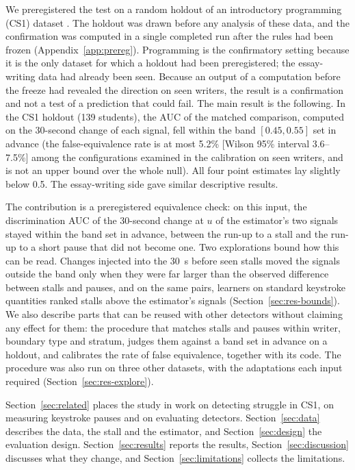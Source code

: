 We preregistered the test on a random holdout of an introductory programming (CS1) dataset \cite{edwards2023cs1}. The
holdout was drawn before any analysis of these data, and the confirmation was computed in a single completed run after
the rules had been frozen (Appendix~\ref{app:prereg}). Programming is the confirmatory setting because it is the only
dataset for which a holdout had been preregistered; the essay-writing data had already been seen. Because an output of a
computation before the freeze had revealed the direction on seen writers, the result is a confirmation and not a test of
a prediction that could fail. The main result is the following. In the CS1 holdout (139 students), the AUC of the matched comparison, computed on
the 30-second change of each signal, fell within the band $[0.45, 0.55]$ set in advance (the false-equivalence rate is at
most 5.2\% [Wilson 95\% interval 3.6--7.5\%] among the configurations examined in the calibration on seen writers, and
is not an upper bound over the whole null). All four point estimates lay slightly below 0.5. The essay-writing side
gave similar descriptive results.

The contribution is a preregistered equivalence check: on this input, the discrimination AUC of the 30-second change
at $u$ of the estimator's two signals stayed within the band set in advance, between the run-up to a stall and the
run-up to a short pause that did not become one. Two explorations bound how this can be read. Changes injected into the
30~s before seen stalls moved the signals outside the band only when they were far larger than the observed difference
between stalls and pauses, and on the same pairs, learners on standard keystroke quantities ranked stalls above the
estimator's signals (Section~\ref{sec:res-bounds}). We also describe parts that can be reused with other detectors
without claiming any effect for them: the procedure that matches stalls and pauses within writer, boundary type and
stratum, judges them against a band set in advance on a holdout, and calibrates the rate of false equivalence, together
with its code. The procedure was also run on three other datasets, with the adaptations each input required
(Section~\ref{sec:res-explore}).

Section~\ref{sec:related} places the study in work on detecting struggle in CS1, on measuring keystroke pauses and on
evaluating detectors. Section~\ref{sec:data} describes the data, the stall and the estimator, and
Section~\ref{sec:design} the evaluation design. Section~\ref{sec:results} reports the results,
Section~\ref{sec:discussion} discusses what they change, and Section~\ref{sec:limitations} collects the limitations.
